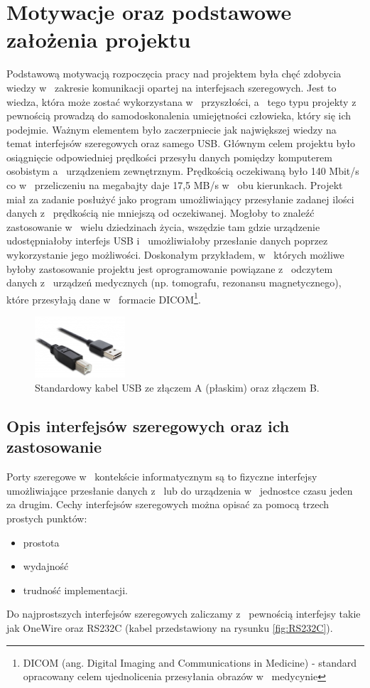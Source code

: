 \documentclass{BscUS}
\begin{document}
\chapter{Motywacje oraz podstawowe założenia projektu}
\label{ch:motivationAndBasics}
\indent Podstawową motywacją rozpoczęcia pracy nad projektem była chęć zdobycia wiedzy w~ zakresie komunikacji opartej na interfejsach szeregowych. Jest to wiedza, która może zostać wykorzystana w~ przyszłości, a~ tego typu projekty z~ pewnością prowadzą do samodoskonalenia umiejętności człowieka, który się ich podejmie. Ważnym elementem było zaczerpniecie jak największej wiedzy na temat interfejsów szeregowych oraz samego USB.
\newline
\indent Głównym celem projektu było osiągnięcie odpowiedniej prędkości przesyłu danych pomiędzy komputerem osobistym a~ urządzeniem zewnętrznym. Prędkością oczekiwaną było 140 Mbit/s co w~ przeliczeniu na megabajty daje 17,5 MB/s w~ obu kierunkach. Projekt miał za zadanie posłużyć jako program umożliwiający przesyłanie zadanej ilości danych z~ prędkością nie mniejszą od oczekiwanej. Mogłoby to znaleźć zastosowanie w~ wielu dziedzinach życia, wszędzie tam gdzie urządzenie udostępniałoby interfejs USB i~ umożliwiałoby przesłanie danych poprzez wykorzystanie jego możliwości. Doskonałym przykładem, w~ których możliwe byłoby zastosowanie projektu jest oprogramowanie powiązane z~ odczytem danych z~ urządzeń medycznych (np. tomografu, rezonansu magnetycznego), które przesyłają dane w~ formacie DICOM\footnote{DICOM (ang. Digital Imaging and Communications in Medicine) - standard opracowany celem ujednolicenia przesyłania obrazów w~ medycynie}.
\begin{figure}[h]
\centering
\includegraphics[width=0.3\textwidth]{./img/usbCable}
\caption{Standardowy kabel USB ze złączem A (płaskim) oraz złączem B.\cite{usbCable}}
\end{figure}
\section{Opis interfejsów szeregowych oraz ich zastosowanie}
\label{s:serialInterface}
\indent Porty szeregowe w~ kontekście informatycznym są to fizyczne interfejsy umożliwiające przesłanie danych z~ lub do urządzenia w~ jednostce czasu jeden za drugim. Cechy interfejsów szeregowych można opisać za pomocą trzech prostych punktów:
\begin{itemize}
\item prostota
\item wydajność
\item trudność implementacji.
\end{itemize}
Do najprostszych interfejsów szeregowych zaliczamy z~ pewnością interfejsy takie jak OneWire oraz RS232C (kabel przedstawiony na rysunku \ref{fig:RS232C}).
\end{document}
